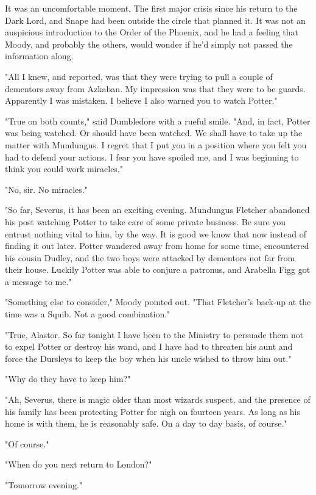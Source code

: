 It was an uncomfortable moment. The first major crisis since his return to the Dark Lord, and Snape had been outside the circle that planned it. It was not an auspicious introduction to the Order of the Phoenix, and he had a feeling that Moody, and probably the others, would wonder if he'd simply not passed the information along.

"All I knew, and reported, was that they were trying to pull a couple of dementors away from Azkaban. My impression was that they were to be guards. Apparently I was mistaken. I believe I also warned you to watch Potter."

"True on both counts," said Dumbledore with a rueful smile. "And, in fact, Potter was being watched. Or should have been watched. We shall have to take up the matter with Mundungus. I regret that I put you in a position where you felt you had to defend your actions. I fear you have spoiled me, and I was beginning to think you could work miracles."

"No, sir. No miracles."

"So far, Severus, it has been an exciting evening. Mundungus Fletcher abandoned his post watching Potter to take care of some private business. Be sure you entrust nothing vital to him, by the way. It is good we know that now instead of finding it out later. Potter wandered away from home for some time, encountered his cousin Dudley, and the two boys were attacked by dementors not far from their house. Luckily Potter was able to conjure a patronus, and Arabella Figg got a message to me."

"Something else to consider," Moody pointed out. "That Fletcher's back-up at the time was a Squib. Not a good combination."

"True, Alastor. So far tonight I have been to the Ministry to persuade them not to expel Potter or destroy his wand, and I have had to threaten his aunt and force the Dursleys to keep the boy when his uncle wished to throw him out."

"Why do they have to keep him?"

"Ah, Severus, there is magic older than most wizards suspect, and the presence of his family has been protecting Potter for nigh on fourteen years. As long as his home is with them, he is reasonably safe. On a day to day basis, of course."

"Of course."

"When do you next return to London?"

"Tomorrow evening."

